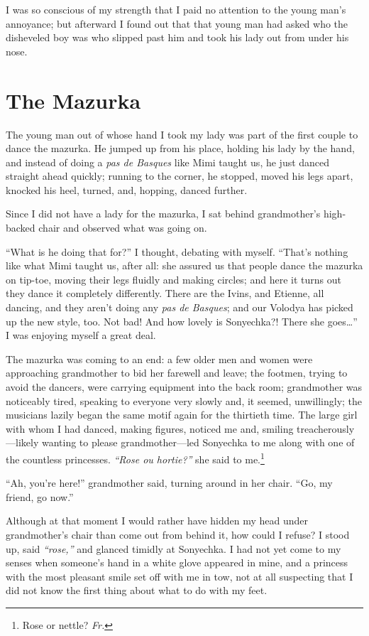 I was so conscious of my strength that I paid no attention to the young man's annoyance; but afterward I found out that that young man had asked who the disheveled boy was who slipped past him and took his lady out from under his nose.

\chapter{The Mazurka} %

The young man out of whose hand I took my lady was part of the first couple to dance the mazurka. He jumped up from his place, holding his lady by the hand, and instead of doing a \textit{pas de Basques} like Mimi taught us, he just danced straight ahead quickly; running to the corner, he stopped, moved his legs apart, knocked his heel, turned, and, hopping, danced further.

Since I did not have a lady for the mazurka, I sat behind grandmother's high-backed chair and observed what was going on.

``What is he doing that for?'' I thought, debating with myself. ``That's nothing like what Mimi taught us, after all: she assured us that people dance the mazurka on tip-toe, moving their legs fluidly and making circles; and here it turns out they dance it completely differently. There are the Ivins, and Etienne, all dancing, and they aren't doing any \textit{pas de Basques}; and our Volodya has picked up the new style, too. Not bad! And how lovely is Sonyechka?! There she goes\ldots{}'' I was enjoying myself a great deal. %

The mazurka was coming to an end: a few older men and women were approaching grandmother to bid her farewell and leave; the footmen, trying to avoid the dancers, were carrying equipment into the back room; grandmother was noticeably tired, speaking to everyone very slowly and, it seemed, unwillingly; the musicians lazily began the same motif again for the thirtieth time. The large girl with whom I had danced, making figures, noticed me and, smiling treacherously---likely wanting to please grandmother---led Sonyechka to me along with one of the countless princesses. \textit{``Rose ou hortie?''} she said to me.\footnote{Rose or nettle? \textit{Fr.}} %

``Ah, you're here!'' grandmother said, turning around in her chair. ``Go, my friend, go now.'' %

Although at that moment I would rather have hidden my head under grandmother's chair than come out from behind it, how could I refuse? I stood up, said \textit{``rose,''} and glanced timidly at Sonyechka. I had not yet come to my senses when someone's hand in a white glove appeared in mine, and a princess with the most pleasant smile set off with me in tow, not at all suspecting that I did not know the first thing about what to do with my feet.

